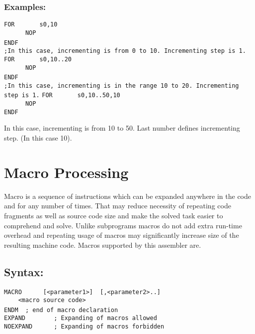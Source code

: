         \subsubsection{Examples:}
        {
            \usecodefont
            \verb'FOR       s0,10'\\
            \verb'      NOP'\\
            \verb'ENDF'
            ~\\
            \verb';In this case, incrementing is from 0 to 10. Incrementing step is 1.'
            \verb'FOR       s0,10..20'\\
            \verb'      NOP'\\
            \verb'ENDF'
            ~\\
            \verb';In this case, incrementing is in the range 10 to 20. Incrementing step is 1.'
            \verb'FOR       s0,10..50,10'\\
            \verb'      NOP'\\
            \verb'ENDF'
        }

        In this case, incrementing is from 10 to 50. Last number defines incrementing step. (In this case 10).\\

    \section{Macro Processing}
        Macro is a sequence of instructions which can be expanded anywhere in the code and for any number of times. That may reduce necessity of repeating code fragments as well as source code size and make the solved task easier to comprehend and solve. Unlike subprograms macros do not add extra run-time overhead and repeating usage of macros may significantly increase size of the resulting machine code. Macros supported by this assembler are.

        \subsection{Syntax:}
        {
            \usecodefont
            \verb'MACRO      [<parameter1>]  [,<parameter2>..]'\\
            \verb'    <macro source code>'\\
            \verb'ENDM  ; end of macro declaration '
            ~\\
            \usecodefont
            \verb'EXPAND        ; Expanding of macros allowed'\\
            \verb'NOEXPAND      ; Expanding of macros forbidden '\\
        }

